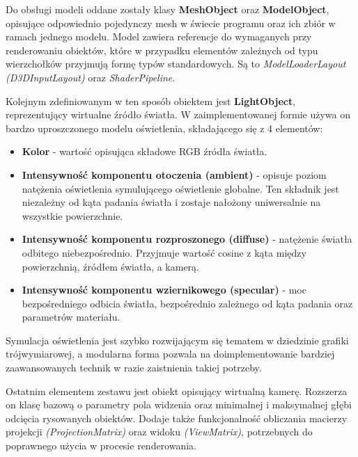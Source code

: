 	Do obsługi modeli oddane zostały klasy \textbf{MeshObject} oraz \textbf{ModelObject}, opisujące odpowiednio pojedynczy mesh w świecie programu oraz ich zbiór w ramach jednego modelu. Model zawiera referencje do wymaganych przy renderowaniu obiektów, które w przypadku elementów zależnych od typu wierzchołków przyjmują formę typów standardowych. Są to \textit{ModelLoaderLayout (D3DInputLayout)} oraz \textit{ShaderPipeline}. 
	
	Kolejnym zdefiniowanym w ten sposób obiektem jest \textbf{LightObject}, reprezentujący wirtualne źródło światła. W zaimplementowanej formie używa on bardzo uproszczonego modelu oświetlenia, składającego się z 4 elementów:
	\begin{itemize}
		\item \textbf{Kolor} - wartość opisująca składowe RGB źródła światła.
		\item \textbf{Intensywność komponentu otoczenia (ambient)} - opisuje poziom natężenia oświetlenia symulującego oświetlenie globalne. Ten składnik jest niezależny od kąta padania światła i zostaje nałożony uniwersalnie na wszystkie powierzchnie.
		\item \textbf{Intensywność komponentu rozproszonego (diffuse)} - natężenie światła odbitego niebezpośrednio. Przyjmuje wartość cosine z kąta między powierzchnią, źródłem światła, a kamerą.
		\item \textbf{Intensywność komponentu wziernikowego (specular)} - moc bezpośredniego odbicia światła, bezpośrednio zależnego od kąta padania oraz parametrów materiału.
	\end{itemize}
	Symulacja oświetlenia jest szybko rozwijającym się tematem w dziedzinie grafiki trójwymiarowej, a modularna forma pozwala na doimplementowanie bardziej zaawansowanych technik w razie zaistnienia takiej potrzeby.
	
	Ostatnim elementem zestawu jest obiekt opisujący wirtualną kamerę. Rozszerza on klasę bazową o parametry pola widzenia oraz minimalnej i maksymalnej głębi odcięcia rysowanych obiektów. Dodaje także funkcjonalność obliczania macierzy projekcji \textit{(ProjectionMatrix)} oraz widoku \textit{(ViewMatrix)}, potrzebnych do poprawnego użycia w procesie renderowania.
	
